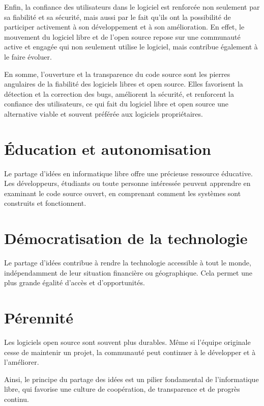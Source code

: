 Enfin, la confiance des utilisateurs dans le logiciel est renforcée non seulement par sa fiabilité et sa sécurité, mais aussi par le fait qu'ils ont la possibilité de participer activement à son développement et à son amélioration. En effet, le mouvement du logiciel libre et de l'open source repose sur une communauté active et engagée qui non seulement utilise le logiciel, mais contribue également à le faire évoluer.

En somme, l'ouverture et la transparence du code source sont les pierres angulaires de la fiabilité des logiciels libres et open source. Elles favorisent la détection et la correction des bugs, améliorent la sécurité, et renforcent la confiance des utilisateurs, ce qui fait du logiciel libre et open source une alternative viable et souvent préférée aux logiciels propriétaires.

\section{Éducation et autonomisation}
Le partage d'idées en informatique libre offre une précieuse ressource éducative. Les développeurs, étudiants ou toute personne intéressée peuvent apprendre en examinant le code source ouvert, en comprenant comment les systèmes sont construits et fonctionnent.

\section{Démocratisation de la technologie}
Le partage d'idées contribue à rendre la technologie accessible à tout le monde, indépendamment de leur situation financière ou géographique. Cela permet une plus grande égalité d'accès et d'opportunités.

\section{Pérennité} 
Les logiciels open source sont souvent plus durables. Même si l'équipe originale cesse de maintenir un projet, la communauté peut continuer à le développer et à l'améliorer.




Ainsi, le principe du partage des idées est un pilier fondamental de l'informatique libre, qui favorise une culture de coopération, de transparence et de progrès continu.
